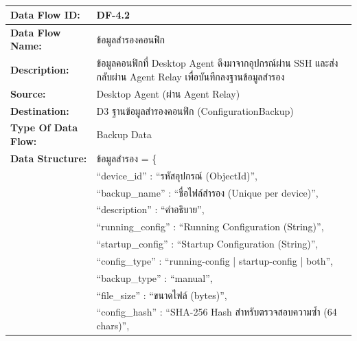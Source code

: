 \begin{table}[H]
    \caption{}
    \label{tab:df-4-2}
    \fontSixTeen 
    \begin{tabularx}{\textwidth}{|l|L|} 
        \hline
        \textbf{Data Flow ID:} & DF-4.2 \\
        \hline
        \textbf{Data Flow Name:} & ข้อมูลสำรองคอนฟิก \\
        \hline
        \textbf{Description:} & ข้อมูลคอนฟิกที่ Desktop Agent ดึงมาจากอุปกรณ์ผ่าน SSH และส่งกลับผ่าน Agent Relay เพื่อบันทึกลงฐานข้อมูลสำรอง \\
        \hline
        \textbf{Source:} & Desktop Agent (ผ่าน Agent Relay) \\
        \hline
        \textbf{Destination:} & D3 ฐานข้อมูลสำรองคอนฟิก (ConfigurationBackup) \\
        \hline
        \textbf{Type Of Data Flow:} & Backup Data \\
        \hline
        \textbf{Data Structure:} & ข้อมูลสำรอง = \{ \nonumber \\
                        & \hspace{1em} ``device\_id'' : ``รหัสอุปกรณ์ (ObjectId)'', \nonumber \\
                        & \hspace{1em} ``backup\_name'' : ``ชื่อไฟล์สำรอง (Unique per device)'', \nonumber \\
                        & \hspace{1em} ``description'' : ``คำอธิบาย'', \nonumber \\
                        & \hspace{1em} ``running\_config'' : ``Running Configuration (String)'', \nonumber \\
                        & \hspace{1em} ``startup\_config'' : ``Startup Configuration (String)'', \nonumber \\
                        & \hspace{1em} ``config\_type'' : ``running-config | startup-config | both'', \nonumber \\
                        & \hspace{1em} ``backup\_type'' : ``manual'', \nonumber \\
                        & \hspace{1em} ``file\_size'' : ``ขนาดไฟล์ (bytes)'', \nonumber \\
                        & \hspace{1em} ``config\_hash'' : ``SHA-256 Hash สำหรับตรวจสอบความซ้ำ (64 chars)'', \nonumber \\

\end{tabularx}
\end{table}
